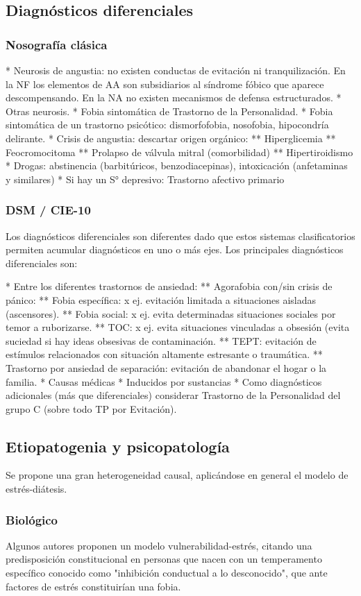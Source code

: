\subsection*{Diagnósticos diferenciales}
\subsubsection*{Nosografía clásica}
* Neurosis de angustia: no existen conductas de evitación ni tranquilización. En la NF los elementos de AA son subsidiarios al síndrome fóbico que aparece descompensando. En la NA no existen mecanismos de defensa estructurados.
* Otras neurosis.
* Fobia sintomática de Trastorno de la Personalidad.
* Fobia sintomática de un trastorno psicótico: dismorfofobia, nosofobia, hipocondría delirante.
* Crisis de angustia: descartar origen orgánico:
** Hiperglicemia
** Feocromocitoma
** Prolapso de válvula mitral (comorbilidad)
** Hipertiroidismo
* Drogas: abstinencia (barbitúricos, benzodiacepinas), intoxicación (anfetaminas y similares)
* Si hay un S° depresivo: Trastorno afectivo primario
\subsubsection*{DSM / CIE-10}
Los diagnósticos diferenciales son diferentes dado que estos sistemas clasificatorios permiten acumular diagnósticos en uno o más ejes. Los principales diagnósticos diferenciales son:

* Entre los diferentes trastornos de ansiedad:
** Agorafobia con/sin crisis de pánico:
** Fobia específica: x ej. evitación limitada a situaciones aisladas (ascensores).
** Fobia social: x ej. evita determinadas situaciones sociales por temor a ruborizarse.
** TOC: x ej. evita situaciones vinculadas a obsesión (evita suciedad si hay ideas obsesivas de contaminación.
** TEPT: evitación de estímulos relacionados con situación altamente estresante o traumática.
** Trastorno por ansiedad de separación: evitación de abandonar el hogar o la familia.
* Causas médicas
* Inducidos por sustancias
* Como diagnósticos adicionales (más que diferenciales) considerar Trastorno de la Personalidad del grupo C (sobre todo TP por Evitación).
\subsection*{Etiopatogenia y psicopatología}
Se propone una gran heterogeneidad causal, aplicándose en general el modelo de estrés-diátesis.
\subsubsection*{Biológico}
Algunos autores proponen un modelo vulnerabilidad-estrés, citando una predisposición constitucional en personas que nacen con un temperamento específico conocido como "inhibición conductual a lo desconocido", que ante factores de estrés constituirían una fobia.


